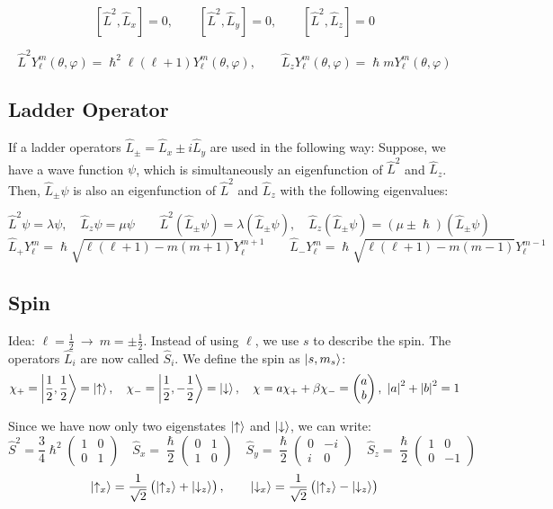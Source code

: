 \documentclass[a4paper, 9pt]{extarticle}
\begin{document}
$$\left[\hat L^2,\hat L_x\right] = 0, \qquad \left[\hat L^2,\hat L_y\right] = 0, \qquad \left[\hat L^2,\hat L_z\right] = 0$$

$$\hat L^2 Y_\ell^m (\theta,\varphi) = \hslash^2 \ell (\ell + 1) Y_\ell^m(\theta,\varphi), \qquad \hat L_z Y_\ell^m(\theta,\varphi) = \hslash m Y_\ell^m(\theta,\varphi)$$

\subsection{Ladder Operator}

If a ladder operators $\hat L_\pm = \hat L_x \pm i \hat L_y$ are used in the following way: Suppose, we have a wave function $\psi$, which is simultaneously an eigenfunction of $\hat L^2$ and $\hat L_z$. Then, $\hat L_\pm \psi$ is also an eigenfunction of $\hat L^2$ and $\hat L_z$ with the following eigenvalues:

$$\hat L^2 \psi = \lambda \psi, \quad \hat L_z \psi = \mu \psi \qquad \hat L^2 (\hat L_\pm \psi) = \lambda (\hat L_\pm \psi), \quad \hat L_z (\hat L_\pm \psi) = (\mu \pm \hslash) (\hat L_\pm \psi)$$ 
$$\hat L_+ Y_\ell^m = \hslash \sqrt{\ell (\ell + 1) - m (m + 1)} Y_\ell^{m+1} \qquad \hat L_- Y_\ell^m = \hslash \sqrt{\ell (\ell + 1) - m (m - 1)} Y_\ell^{m-1}$$

\subsection{Spin}

Idea: $\ell = \frac12 \ \rightarrow \ m = \pm \frac12$. Instead of using $\ell$, we use $s$ to describe the spin. The operators $\hat L_i$ are now called $\hat S_i$. We define the spin as $\ket{s,m_s}$:
$$\chi_+ = \Ket{\frac12,\frac12} = \ket{\uparrow}, \quad \chi_- = \Ket{\frac12,-\frac12} = \ket{\downarrow}, \quad \chi = a \chi_+ + \beta \chi_- = \begin{pmatrix}a\\b\end{pmatrix}, \ \left| a \right|^2 + \left| b \right|^2 = 1$$

Since we have now only two eigenstates $\ket{\uparrow}$ and $\ket{\downarrow}$, we can write:
$$\hat S^2 = \frac{3}{4} \hslash^2 \begin{pmatrix} 1&0\\0&1 \end{pmatrix} \quad \hat S_x = \frac{\hslash}{2} \begin{pmatrix} 0&1\\1&0 \end{pmatrix} \quad \hat S_y = \frac{\hslash}{2} \begin{pmatrix} 0&-i\\i&0 \end{pmatrix} \quad \hat S_z = \frac{\hslash}{2} \begin{pmatrix} 1&0\\0&-1 \end{pmatrix}$$
$$\ket{\uparrow_x} = \frac{1}{\sqrt{2}} \left(\ket{\uparrow_z} + \ket{\downarrow_z} \right), \qquad \ket{\downarrow_x} = \frac{1}{\sqrt{2}} \left(\ket{\uparrow_z} - \ket{\downarrow_z} \right)$$
\end{document}
